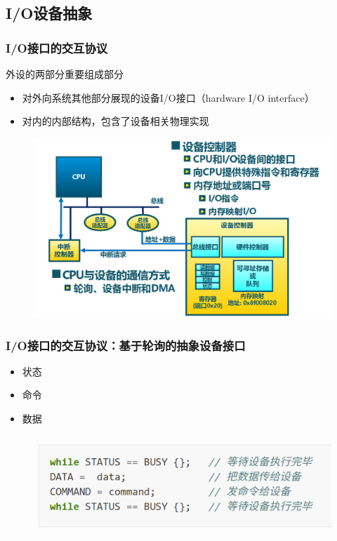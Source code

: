 \subsection{I/O设备抽象} %
\begin{frame}[fragile]
    \frametitle{I/O接口的交互协议}
    外设的两部分重要组成部分
    \begin{itemize}
        \item 对外向系统其他部分展现的设备I/O接口（hardware I/O interface）
        \item 对内的内部结构，包含了设备相关物理实现
    \end{itemize}
    \begin{figure}
    \includegraphics[width=0.5\linewidth]{figs/cpu-connect-dev.png}
\end{figure}
\end{frame}

\begin{frame}[fragile]
    \frametitle{I/O接口的交互协议：基于轮询的抽象设备接口}
    \begin{itemize}
        \item 状态
        \item 命令
        \item 数据
    \end{itemize}
    \begin{figure}
        \includegraphics[width=0.7\linewidth]{figs/simple-io-interface.png}
    \end{figure}
\end{frame}

